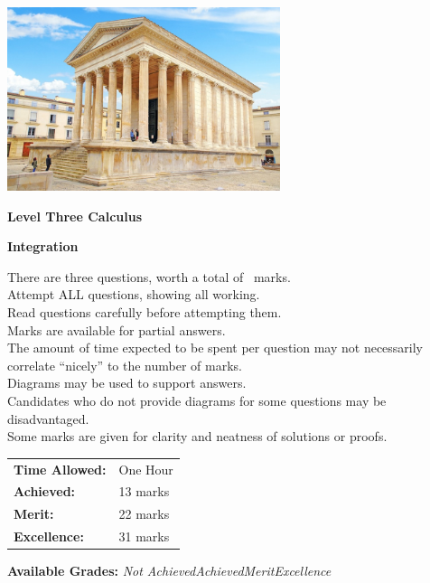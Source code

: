 \documentclass[a4paper,addpoints]{exam}
\begin{document}
\begin{coverpages}

\begin{center}
  \includegraphics[width=0.6\textwidth]{exam-cover-02}

  \vspace{5mm}

  \textbf{\Huge{Level Three Calculus}}

  \vspace{2mm}

  \textbf{\Huge{Integration}}
\end{center}

\vspace{5mm}

\noindent
\large{There are three questions, worth a total of \numpoints\ marks.\\
       Attempt ALL questions, showing all working.\\
       Read questions carefully before attempting them.\\
       Marks are available for partial answers.\\
       The amount of time expected to be spent per question may not necessarily correlate ``nicely'' to the number of marks.\\
       Diagrams may be used to support answers.\\
       Candidates who do not provide diagrams for some questions may be disadvantaged.\\
       Some marks are given for clarity and neatness of solutions or proofs.}
\vspace{2mm}

\begin{tabular}{ll}
  \textbf{Time Allowed:}& One Hour\\
  \textbf{Achieved:}& 13 marks\\
  \textbf{Merit:}& 22 marks\\
  \textbf{Excellence:}& 31 marks
\end{tabular}

\vfill

\begin{center}
  \gradetable[h][questions]
  \vspace{2mm}

  \textbf{Available Grades:} \textit{Not Achieved}\quad\textit{Achieved}\quad\textit{Merit}\quad\textit{Excellence}
\end{center}

\end{coverpages}
\end{document}
